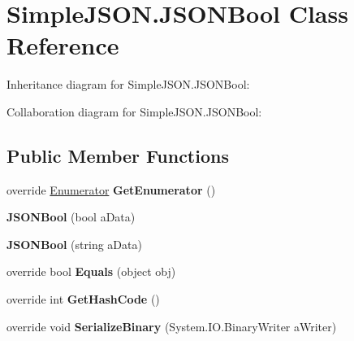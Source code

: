 \hypertarget{classSimpleJSON_1_1JSONBool}{}\section{Simple\+J\+S\+O\+N.\+J\+S\+O\+N\+Bool Class Reference}
\label{classSimpleJSON_1_1JSONBool}


Inheritance diagram for Simple\+J\+S\+O\+N.\+J\+S\+O\+N\+Bool\+:


Collaboration diagram for Simple\+J\+S\+O\+N.\+J\+S\+O\+N\+Bool\+:
\subsection*{Public Member Functions}
\begin{DoxyCompactItemize}
\item 
override \hyperlink{structSimpleJSON_1_1JSONNode_1_1Enumerator}{Enumerator} {\bfseries Get\+Enumerator} ()\hypertarget{classSimpleJSON_1_1JSONBool_aff23c00f6dab10f4c9f849d4989e4ec5}{}\label{classSimpleJSON_1_1JSONBool_aff23c00f6dab10f4c9f849d4989e4ec5}

\item 
{\bfseries J\+S\+O\+N\+Bool} (bool a\+Data)\hypertarget{classSimpleJSON_1_1JSONBool_aa8802752ab09e90103365d075a7344f0}{}\label{classSimpleJSON_1_1JSONBool_aa8802752ab09e90103365d075a7344f0}

\item 
{\bfseries J\+S\+O\+N\+Bool} (string a\+Data)\hypertarget{classSimpleJSON_1_1JSONBool_a41cfc348877baaeb84146fb7b9dc7ce7}{}\label{classSimpleJSON_1_1JSONBool_a41cfc348877baaeb84146fb7b9dc7ce7}

\item 
override bool {\bfseries Equals} (object obj)\hypertarget{classSimpleJSON_1_1JSONBool_a849acd13fe318ce551a57324e8e4233d}{}\label{classSimpleJSON_1_1JSONBool_a849acd13fe318ce551a57324e8e4233d}

\item 
override int {\bfseries Get\+Hash\+Code} ()\hypertarget{classSimpleJSON_1_1JSONBool_a5d9524b759b39f2bafe1d24618b6db35}{}\label{classSimpleJSON_1_1JSONBool_a5d9524b759b39f2bafe1d24618b6db35}

\item 
override void {\bfseries Serialize\+Binary} (System.\+I\+O.\+Binary\+Writer a\+Writer)\hypertarget{classSimpleJSON_1_1JSONBool_a67e426e5efe88faf2668d257a85cda67}{}\label{classSimpleJSON_1_1JSONBool_a67e426e5efe88faf2668d257a85cda67}

\end{DoxyCompactItemize}
